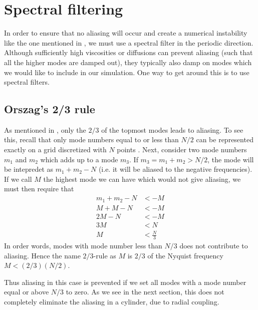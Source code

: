 \section{Spectral filtering}
%
In order to ensure that no aliasing will occur and create a numerical instability like the one mentioned in \cite{Phillips1959}, we must use a spectral filter in the periodic direction.
Although sufficiently high viscosities or diffusions can prevent aliasing (such that all the higher modes are damped out), they typically also damp on modes which we would like to include in our simulation.
One way to get around this is to use spectral filters.

\subsection{Orszag's 2/3 rule}
As mentioned in \cite{Orszag1971}, only the $2/3$ of the topmost modes leads to aliasing.
To see this, recall that only mode numbers equal to or less than $N/2$ can be represented exactly on a grid discretized with $N$ points \cite{Bracewell2000book}.
Next, consider two mode numbers $m_1$ and $m_2$ which adds up to a mode $m_3$.
If $m_3=m_1+m_2>N/2$, the mode will be intepredet as $m_1+m_2 - N$ (i.e. it will be aliased to the negative frequencies).
If we call $M$ the highest mode we can have which would not give aliasing, we must then require that
%
\begin{align*}
    m_1+m_2 - N &< -M\\
    M + M - N &< -M\\
    2M - N &< -M\\
    3M &<  N\\
    M &< \frac{N}{3}
\end{align*}
%
In order words, modes with mode number less than $N/3$ does not contribute to aliasing.
Hence the name $2/3$-rule as $M$ is $2/3$ of the Nyquist frequency $M < (2/3)(N/2)$.

Thus aliasing in this case is prevented if we set all modes with a mode number equal or above $N/3$ to zero.
As we see in the next section, this does not completely eliminate the aliasing in a cylinder, due to radial coupling.

